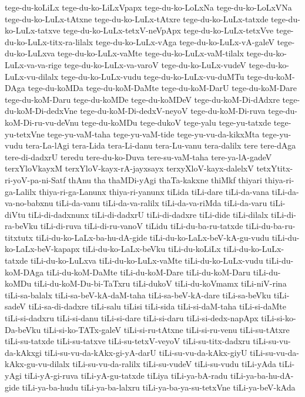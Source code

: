 {tege-du-koLiLx
tege-du-ko-LiLxVpapx
tege-du-ko-LoLxNa
tege-du-ko-LoLxVNa
tege-du-ko-LuLx-tAtxne
tege-du-ko-LuLx-tAtxre
tege-du-ko-LuLx-tatxde
tege-du-ko-LuLx-tatxve
tege-du-ko-LuLx-tetxV-neVpApx
tege-du-ko-LuLx-tetxVve
tege-du-ko-LuLx-titx-ra-lilalx
tege-du-ko-LuLx-vAga
tege-du-ko-LuLx-vA-galeV
tege-du-ko-LuLxva
tege-du-ko-LuLx-vaMte
tege-du-ko-LuLx-vaM-tilalx
tege-du-ko-LuLx-va-va-rige
tege-du-ko-LuLx-va-varoV
tege-du-ko-LuLx-vudeV
tege-du-ko-LuLx-vu-dilalx
tege-du-ko-LuLx-vudu
tege-du-ko-LuLx-vu-duMTu
tege-du-koM-DAga
tege-du-koMDa
tege-du-koM-DaMte
tege-du-koM-DarU
tege-du-koM-Dare
tege-du-koM-Daru
tege-du-koMDe
tege-du-koMDeV
tege-du-koM-Di-dAdxre
tege-du-koM-Di-dedxVne
tege-du-koM-Di-dedxV-neyoV
tege-du-koM-Di-ruva
tege-du-koM-Di-ru-vu-deVnu
tege-du-koMDu
tege-dukoV
tege-yalu
tege-yu-tatxde
tege-yu-tetxVne
tege-yu-vaM-taha
tege-yu-vaM-tide
tege-yu-vu-da-kikxMta
tege-yu-vudu
tera-La-lAgi
tera-Lida
tera-Li-danu
tera-Lu-vanu
tera-dalilx
tere
tere-dAga
tere-di-dadxrU
teredu
tere-du-ko-Duva
tere-su-vaM-taha
tere-ya-lA-gadeV
terxYloVkayxM
terxYloV-kayx-rA-jayxsayx
terxyXloV-kayx-dalelxV
tetxYtitx-ri-yoV-pa-ni-Satf
thAnu
tha
thaMDi-yAgi
thaTa-kakxne
thiMkf
thiyari
thiya-ri-ga-Lalilx
thiya-ri-ga-Lanunx
thiya-ri-yanunx
tiLida
tiLi-dare
tiLi-da-vana
tiLi-da-va-no-babxnu
tiLi-da-vanu
tiLi-da-va-ralilx
tiLi-da-va-riMda
tiLi-da-varu
tiLi-diVtu
tiLi-di-dadxnunx
tiLi-di-dadxrU
tiLi-di-dadxre
tiLi-dide
tiLi-dilalx
tiLi-di-ra-beVku
tiLi-di-ruva
tiLi-di-ru-vanoV
tiLidu
tiLi-du-ba-ru-tatxde
tiLi-du-ba-ru-titxtutx
tiLi-du-ko-LaLx-ba-hu-dA-gide
tiLi-du-ko-LaLx-beV-kA-gu-vudu
tiLi-du-ko-LaLx-beV-kapapx
tiLi-du-ko-LaLx-beVku
tiLi-du-koLiLx
tiLi-du-ko-LuLx-tatxde
tiLi-du-ko-LuLxva
tiLi-du-ko-LuLx-vaMte
tiLi-du-ko-LuLx-vudu
tiLi-du-koM-DAga
tiLi-du-koM-DaMte
tiLi-du-koM-Dare
tiLi-du-koM-Daru
tiLi-du-koMDu
tiLi-du-koM-Du-bi-TaTxru
tiLi-dukoV
tiLi-du-koVmamx
tiLi-niV-rina
tiLi-sa-balalx
tiLi-sa-beV-kA-daM-taha
tiLi-sa-beV-kA-dare
tiLi-sa-beVku
tiLi-sadeV
tiLi-sa-di-dadxre
tiLi-salu
tiLisi
tiLi-sida
tiLi-si-daM-taha
tiLi-si-daMte
tiLi-si-dadxru
tiLi-si-danu
tiLi-si-dare
tiLi-si-daru
tiLi-si-dedx-napApx
tiLi-si-ko-Da-beVku
tiLi-si-ko-TATx-galeV
tiLi-si-ru-tAtxne
tiLi-si-ru-venu
tiLi-su-tAtxre
tiLi-su-tatxde
tiLi-su-tatxve
tiLi-su-tetxV-veyoV
tiLi-su-titx-dadxru
tiLi-su-vu-da-kAkxgi
tiLi-su-vu-da-kAkx-gi-yA-darU
tiLi-su-vu-da-kAkx-giyU
tiLi-su-vu-da-kAkx-gu-vu-dilalx
tiLi-su-vu-da-ralilx
tiLi-su-vudeV
tiLi-su-vudu
tiLi-yAda
tiLi-yAgi
tiLi-yA-gi-ruva
tiLi-yA-gu-tatxde
tiLiya
tiLi-ya-bA-radu
tiLi-ya-ba-hu-dA-gide
tiLi-ya-ba-hudu
tiLi-ya-ba-lalxru
tiLi-ya-ba-ya-su-tetxVne
tiLi-ya-beV-kAda
}
